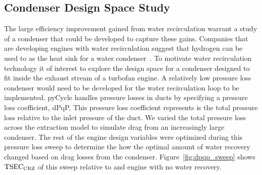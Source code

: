 \documentclass[conf]{new-aiaa}
\begin{document}
\subsection{Condenser Design Space Study}
\label{sub:dpqp_sweep}
The large efficiency improvement gained from water recirculation warrant a study of a condenser that could be developed to capture these gains.
Companies that are developing engines with water recirculation suggest that hydrogen can be used to as the heat sink for a water condenser~\cite{arpa-e_2021}.
To motivate water recirculation technology it of interest to explore the design space for a condenser designed to fit inside the exhaust stream of a turbofan engine.
A relatively low pressure loss condenser would need to be developed for the water recirculation loop to be implemented.
pyCycle handles pressure losses in ducts by specifying a pressure loss coefficient, dPqP.
This pressure loss coefficient represents is the total pressure loss relative to the inlet pressure of the duct.
We varied the total pressure loss across the extraction model to simulate drag from an increasingly large condenser.
The rest of the engine design variables were optimized during this pressure loss sweep to determine the how the optimal amount of water recovery changed based on drag losses from the condenser.
Figure~\ref{fig:dpqp_sweep} shows $\rm{TSEC}_{\rm{CRZ}}$ of this sweep relative to and engine with no water recovery.
\end{document}
